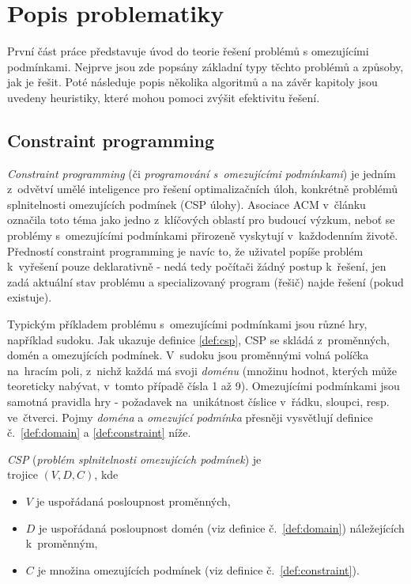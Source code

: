 \chapter{Popis problematiky}
První část práce představuje úvod do teorie řešení problémů s omezujícími podmínkami. Nejprve jsou zde popsány základní typy těchto problémů a způsoby, jak je řešit. Poté následuje popis několika algoritmů a na závěr kapitoly jsou uvedeny heuristiky, které mohou pomoci zvýšit efektivitu řešení.


\section{Constraint programming}
\emph{Constraint programming} (či \emph{programování s~omezujícími podmínkami}) je jedním z~odvětví umělé inteligence pro řešení optimalizačních úloh, konkrétně problémů splnitelnosti omezujících podmínek (CSP úlohy). Asociace ACM v~článku \cite{Wegner1996} označila toto téma jako jedno z~klíčových oblastí pro budoucí výzkum, neboť se problémy s~omezujícími podmínkami přirozeně vyskytují v~každodenním životě. Předností constraint programming je navíc to, že uživatel popíše problém k~vyřešení pouze deklarativně - nedá tedy počítači žádný postup k~řešení, jen zadá aktuální stav problému a specializovaný program (řešič) najde řešení (pokud existuje).

Typickým příkladem problému s~omezujícími podmínkami jsou různé hry, například sudoku. Jak ukazuje definice \ref{def:csp}, CSP se skládá z~proměnných, domén a omezujících podmínek. V~sudoku jsou proměnnými volná políčka na~hracím poli, z~nichž každá má svoji \emph{doménu} (množinu hodnot, kterých může teoreticky nabývat, v~tomto případě čísla 1 až 9). Omezujícími podmínkami jsou samotná pravidla hry - požadavek na~unikátnost číslice v~řádku, sloupci, resp. ve~čtverci. Pojmy \emph{doména} a \emph{omezující podmínka} přesněji vysvětlují definice č.~\ref{def:domain} a \ref{def:constraint} níže.

\begin{definition}
\label{def:csp}
\emph{CSP} (\emph{problém splnitelnosti omezujících podmínek}) je \\ trojice $(V, D, C)$, kde
\begin{itemize}
  \item $V$ je uspořádaná posloupnost proměnných,
  \item $D$ je uspořádaná posloupnost domén (viz definice č.~\ref{def:domain}) náležejících k~proměnným,
  \item $C$ je množina omezujících podmínek (viz definice č.~\ref{def:constraint}).
\end{itemize}
\end{definition}

